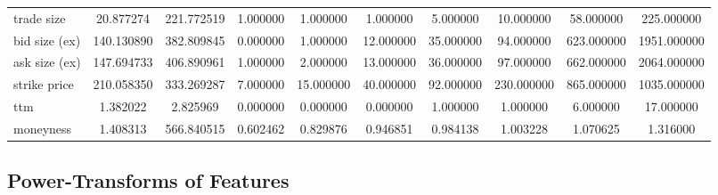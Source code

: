 \begin{table}[ht!]
\begin{tabular}{@{}lSSSSSSSSS@{}}
        trade size           & 20.877274                        & 221.772519  & 1.000000 & 1.000000  & 1.000000  & 5.000000  & 10.000000  & 58.000000  & 225.000000  \\
        bid size (ex)        & 140.130890                       & 382.809845  & 0.000000 & 1.000000  & 12.000000 & 35.000000 & 94.000000  & 623.000000 & 1951.000000 \\
        ask size (ex)        & 147.694733                       & 406.890961  & 1.000000 & 2.000000  & 13.000000 & 36.000000 & 97.000000  & 662.000000 & 2064.000000 \\
        strike price         & 210.058350                       & 333.269287  & 7.000000 & 15.000000 & 40.000000 & 92.000000 & 230.000000 & 865.000000 & 1035.000000 \\
        ttm                  & 1.382022                         & 2.825969    & 0.000000 & 0.000000  & 0.000000  & 1.000000  & 1.000000   & 6.000000   & 17.000000   \\
        moneyness            & 1.408313                         & 566.840515  & 0.602462 & 0.829876  & 0.946851  & 0.984138  & 1.003228   & 1.070625   & 1.316000    \\
        \bottomrule
    \end{tabular}
\end{table}

\clearpage

\subsection{Power-Transforms of Features}
\label{app:power-transforms-of-features}

